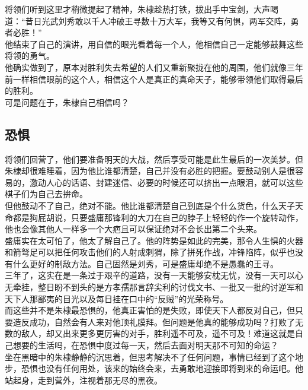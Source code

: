\begin{multicols}{\theparacolNo}
将领们听到这里才稍微提起了精神，朱棣趁热打铁，拔出手中宝剑，大声喝道：“昔日光武刘秀敢以千人冲破王寻数十万大军，我等又有何惧，两军交阵，勇者必胜！”\\

他结束了自己的演讲，用自信的眼光看着每一个人，他相信自己一定能够鼓舞这些将领的勇气。\\

他确实做到了，原本对胜利失去希望的人们又重新聚拢在他的周围，他们就像三年前一样相信眼前的这个人，相信这个人是真正的真命天子，能够带领他们取得最后的胜利。\\

可是问题在于，朱棣自己相信吗？\\

\subsection{恐惧}
将领们回营了，他们要准备明天的大战，然后享受可能是此生最后的一次美梦。但朱棣却很难睡着，因为他比谁都清楚，自己并没有必胜的把握。要鼓动别人是很容易的，激动人心的话语、封建迷信、必要的时候还可以挤出一点眼泪，就可以这些棋子们为自己去拚命。\\

但他鼓动不了自己，绝对不能。他比谁都清楚自己到底是个什么货色，什么天子天命都是狗屁胡说，只要盛庸那锋利的大刀在自己的脖子上轻轻的作一个旋转动作，他也会像其他人一样多一个大疤且可以保证绝对不会长出第二个头来。\\

盛庸实在太可怕了，他太了解自己了。他的阵势是如此的完美，那令人生惧的火器和箭弩足可以把任何攻击他们的人射成刺猬，除了拼死作战，冲锋陷阵，似乎也没有什么更好的制敌方法。自己固然是刘秀，可是盛庸却绝不是愚蠢的王寻。\\

三年了，这实在是一条过于艰辛的道路，没有一天能够安枕无忧，没有一天可以心无牵挂，整日盼不到头的是方孝孺那言辞尖利的讨伐文书、一批又一批的讨逆军和天下人那鄙夷的目光以及每日挂在口中的“反贼”的光荣称号。\\

而这些并不是朱棣最恐惧的，他真正害怕的是失败，即使天下人都反对自己，但只要造反成功，自然会有人来对他顶礼膜拜。但问题是他真的能够成功吗？打败了无数的敌人，却又出来更多更厉害的对手，胜利遥不可及，遥不可及！难道这就是自己想要的生活吗，在恐惧中度过每一天，然后去面对明天那不可知的命运？\\

坐在黑暗中的朱棣静静的沉思着，但思考解决不了任何问题，事情已经到了这个地步，恐惧也没有任何用处，该来的始终会来，去勇敢地迎接即将到来的命运吧。他站起身，走到营外，注视着那无尽的黑夜。\\


\end{multicols}
